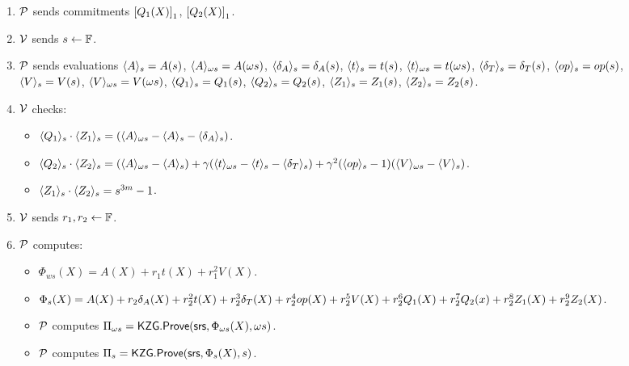 \begin{figure}[htbp]
\begin{mdframed}
{\begin{enumerate}[leftmargin=1em, label=\arabic*]
            \item $\prover$ sends commitments $\gone{Q_1(X)}$, $\gone{Q_2(X)}$.
            \item $\verifier$ sends $s\gets\F$.
            \item $\prover$ sends evaluations $\val{s}{A}=A(s)$, $\val{\omega s}{A}=A(\omega s)$, $\val{s}{\delta_A} = \delta_A(s)$, $\val{s}{t}=t(s)$, $\val{\omega s}{t}=t(\omega s)$, $\val{s}{\delta_T} = \delta_T(s)$, $\val{s}{\op}=\op(s)$, $\val{s}{V}=V(s)$, $\val{\omega s}{V}=V(\omega s)$, $\val{s}{Q_1}=Q_1(s)$, $\val{s}{Q_2}=Q_2(s)$, $\val{s}{Z_1}=Z_1(s)$, $\val{s}{Z_2}=Z_2(s)$.
            \item $\verifier$ checks:
            \begin{itemize}
                \item $\val{s}{Q_1}\cdot \val{s}{Z_1} = (\val{\omega s}{A} - \val{s}{A} - \val{s}{\delta_A})$.
                \item  $\val{s}{Q_2}\cdot \val{s}{Z_2} = (\val{\omega s}{A} - \val{s}{A})+\gamma (\val{\omega s}{t} - \val{s}{t} - \val{s}{\delta_T})+\gamma^2 (\val{s}{\op}-1)(\val{\omega s}{V} - \val{s}{V}) $.
                \item $\val{s}{Z_1} \cdot \val{s}{Z_2}=s^{3m}-1$.
            \end{itemize}
            \item $\verifier$ sends $r_1, r_2\gets\F$.
            \item $\prover$ computes:
            \begin{itemize}
                \item $\Phi_{ws}(X)= A(X)+r_1 t(X) +r_1^2 V(X)$.
                \item $\Phi_s(X)=A(X)+r_2 \delta_A(X)+r_2^2 t(X)+ r_2^3 \delta_T(X)+r_2^4 \op(X) +r_2^5 V(X)+r_2^6 Q_1(X)+ r_2^7 Q_2(x)+r_2^8 Z_1(X)+r_2^9 Z_2(X)$.
                \item $\prover$ computes $\Pi_{\omega s} = \KZGopen(\srs, \Phi_{\omega s}(X), \omega s)$.
                \item $\prover$ computes $\Pi_{s} = \KZGopen(\srs, \Phi_{s}(X),s)$.


\end{itemize}
\end{enumerate}}
\end{mdframed}
\end{figure}
